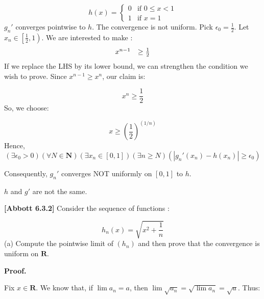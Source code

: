 \documentclass[10pt]{article}
\begin{document}
\begin{equation*}
h( x) =\begin{cases}
0 & \text{if } 0\leq x< 1\\
1 & \text{if } x=1
\end{cases}
\end{equation*}
$\displaystyle g_{n} '$ converges pointwise to $\displaystyle h$. The convergence is not uniform. Pick $\displaystyle \epsilon _{0} =\frac{1}{2}$. Let $\displaystyle x_{n} \in \left[\frac{1}{2} ,1\right)$. We are interested to make :
\begin{equation*}
\begin{array}{ c c }
x^{n-1} & \geq \frac{1}{2}
\end{array}
\end{equation*}
If we replace the LHS by its lower bound, we can strengthen the condition we wish to prove. Since $\displaystyle x^{n-1} \geq x^{n}$, our claim is:


\begin{equation*}
x^{n} \geq \frac{1}{2}
\end{equation*}
So, we choose:


\begin{equation*}
x\geq \left(\frac{1}{2}\right)^{( 1/n)}
\end{equation*}
Hence,
\begin{equation*}
( \exists \epsilon _{0}  >0)( \forall N\in \mathbf{N})( \exists x_{n} \in [ 0,1])( \exists n\geq N)( |g_{n} '( x_{n}) -h( x_{n}) |\geq \epsilon _{0})
\end{equation*}


Consequently, $\displaystyle g_{n} '$ converges \textcolor[rgb]{0.82,0.01,0.11}{NOT }uniformly on $\displaystyle [ 0,1]$ to $\displaystyle h$.



$\displaystyle h$ and $\displaystyle g'$ are not the same.



\textbf{[Abbott 6.3.2]} Consider the sequence of functions :


\begin{equation*}
h_{n}( x) =\sqrt{x^{2} +\frac{1}{n}}
\end{equation*}
(a) Compute the pointwise limit of $\displaystyle ( h_{n})$ and then prove that the convergence is uniform on $\displaystyle \mathbf{R}$.



\textbf{Proof.}



Fix $\displaystyle x\in \mathbf{R}$. We know that, if $\displaystyle \lim a_{n} =a$, then $\displaystyle \lim \sqrt{a_{n}} =\sqrt{\lim a_{n}} =\sqrt{a}$. Thus:
\end{document}
